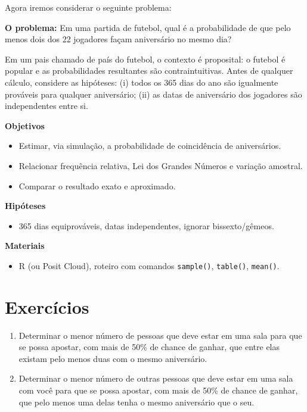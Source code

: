 \documentclass[
  letterpaper,
  DIV=11,
  numbers=noendperiod]{scrreprt}
\providecommand{\tightlist}{%
  \setlength{\itemsep}{0pt}\setlength{\parskip}{0pt}}\usepackage{longtable,booktabs,array}
\begin{document}
Agora iremos considerar o seguinte problema:

\textbf{O problema:} Em uma partida de futebol, qual é a probabilidade
de que pelo menos dois dos 22 jogadores façam aniversário no mesmo dia?

Em um pais chamado de país do futebol, o contexto é proposital: o
futebol é popular e as probabilidades resultantes são contraintuitivas.
Antes de qualquer cálculo, considere as hipóteses: (i) todos os 365 dias
do ano são igualmente prováveis para qualquer aniversário; (ii) as datas
de aniversário dos jogadores são independentes entre si.

\textbf{Objetivos}

\begin{itemize}
\tightlist
\item
  Estimar, via simulação, a probabilidade de coincidência de
  aniversários.\\
\item
  Relacionar frequência relativa, Lei dos Grandes Números e variação
  amostral.\\
\item
  Comparar o resultado exato e aproximado.\\
\end{itemize}

\textbf{Hipóteses}

\begin{itemize}
\tightlist
\item
  365 dias equiprováveis, datas independentes, ignorar bissexto/gêmeos.
\end{itemize}

\textbf{Materiais}

\begin{itemize}
\tightlist
\item
  R (ou Posit Cloud), roteiro com comandos \texttt{sample()},
  \texttt{table()}, \texttt{mean()}.
\end{itemize}

\section{Exercícios}\label{exercuxedcios}

\begin{enumerate}
\def\labelenumi{\arabic{enumi})}
\item
  Determinar o menor número de pessoas que deve estar em uma sala para
  que se possa apostar, com mais de 50\% de chance de ganhar, que entre
  elas existam pelo menos duas com o mesmo aniversário.
\item
  Determinar o menor número de outras pessoas que deve estar em uma sala
  com você para que se possa apostar, com mais de 50\% de chance de
  ganhar, que pelo menos uma delas tenha o mesmo aniversário que o seu.
\end{enumerate}
\end{document}
